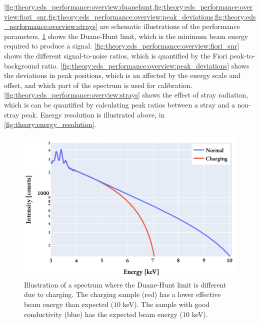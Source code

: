 \cref{fig:theory:eds_performance:overview:duanehunt,fig:theory:eds_performance:overview:fiori_snr,fig:theory:eds_performance:overview:peak_deviations,fig:theory:eds_performance:overview:strays} are schematic illustrations of the performance parameters.
\cref{fig:theory:eds_performance:overview:duanehunt} shows the Duane-Hunt limit, which is the minimum beam energy required to produce a signal.
\cref{fig:theory:eds_performance:overview:fiori_snr} shows the different signal-to-noise ratios, which is quantified by the Fiori peak-to-background ratio.
\cref{fig:theory:eds_performance:overview:peak_deviations} shows the deviations in peak positions, which is an affected by the energy scale and offset, and which part of the spectrum is used for calibration.
\cref{fig:theory:eds_performance:overview:strays} shows the effect of stray radiation, which is can be quantified by calculating peak ratios between a stray and a non-stray peak.
Energy resolution is illustrated above, in \cref{fig:theory:energy_resolution}.


\begin{figure}[htp]
    \centering
    \includegraphics[width=0.6\linewidth]{figures/pp_duane-hunt.pdf}
    \caption{
        Illustration of a spectrum where the Duane-Hunt limit is different due to charging.
        The charging sample (red) has a lower effective beam energy than expected ($10$ keV).
        The sample with good conductivity (blue) has the expected beam energy ($10$ keV).
    }
    \label{fig:theory:eds_performance:overview:duanehunt}
\end{figure}


